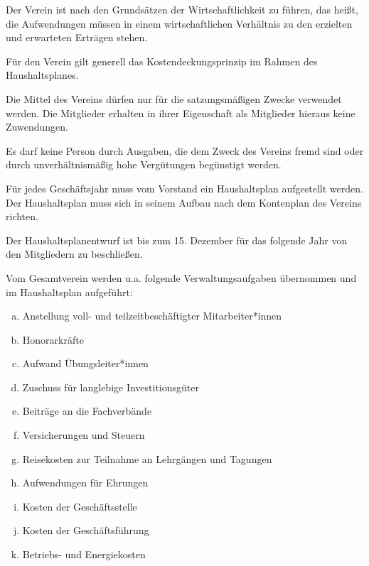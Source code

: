 \begin{finanz}


  Der Verein ist nach den Grundsätzen der Wirtschaftlichkeit zu führen, das heißt, die Aufwendungen müssen in einem wirtschaftlichen Verhältnis zu den erzielten und erwarteten Erträgen stehen.

  Für den Verein gilt generell das Kostendeckungsprinzip im Rahmen des Haushaltsplanes.

  Die Mittel des Vereins dürfen nur für die satzungsmäßigen Zwecke verwendet werden. Die Mitglieder erhalten in ihrer Eigenschaft als Mitglieder hieraus keine Zuwendungen.

  Es darf keine Person durch Ausgaben, die dem Zweck des Vereins fremd sind oder durch unverhältnismäßig hohe Vergütungen begünstigt werden.

  \label{haushaltsplan}

  Für jedes Geschäftsjahr muss vom Vorstand ein Haushaltsplan aufgestellt werden. Der Haushaltsplan muss sich in seinem Aufbau nach dem Kontenplan des Vereins richten.

  Der Haushaltsplanentwurf ist bis zum 15. Dezember für das folgende Jahr von den Mitgliedern zu beschließen.

  Vom Gesamtverein werden u.a. folgende Verwaltungsaufgaben übernommen und im Haushaltsplan aufgeführt:
  \begin{enumerate}[(a)]
    \item Anstellung voll- und teilzeitbeschäftigter Mitarbeiter*innen
    \item Honorarkräfte
    \item Aufwand Übungsleiter*innen
    \item Zuschuss für langlebige Investitionsgüter
    \item Beiträge an die Fachverbände
    \item Versicherungen und Steuern
    \item Reisekosten zur Teilnahme an Lehrgängen und Tagungen
    \item Aufwendungen für Ehrungen
    \item Kosten der Geschäftsstelle
    \item Kosten der Geschäftsführung
    \item Betriebs- und Energiekosten
  \end{enumerate}



\end{finanz}
